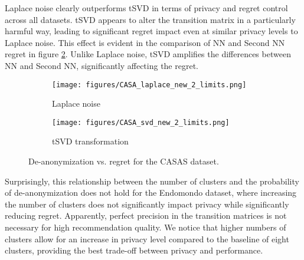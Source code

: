 \documentclass{article}
\begin{document}
Laplace noise clearly outperforms tSVD in terms of privacy and regret control across all datasets. tSVD appears to alter the transition matrix in a particularly harmful way, leading to significant regret impact even at similar privacy levels to Laplace noise. This effect is evident in the comparison of NN and Second NN regret in figure \ref{fig:CASAS_svd}. Unlike Laplace noise, tSVD amplifies the differences between NN and Second NN, significantly affecting the regret.

\begin{figure}
     \centering
     \begin{subfigure}[b]{0.45\textwidth}
         \centering
         \texttt{[image: figures/CASA\_laplace\_new\_2\_limits.png]}
         \caption{Laplace noise}
         \label{fig:CASAS_laplace}
     \end{subfigure}
     \hfill
     \begin{subfigure}[b]{0.45\textwidth}
         \centering
         \texttt{[image: figures/CASA\_svd\_new\_2\_limits.png]}
         \caption{tSVD transformation}
         \label{fig:CASAS_svd}
     \end{subfigure}
     \caption{De-anonymization vs. regret for the CASAS dataset.}
     \label{fig:CASAS_regret_privacy}
\end{figure}

Surprisingly, this relationship between the number of clusters and the probability of de-anonymization does not hold for the Endomondo dataset, where increasing the number of clusters does not significantly impact privacy while significantly reducing regret. Apparently, perfect precision in the transition matrices is not necessary for high recommendation quality. We notice that higher numbers of clusters allow for an increase in privacy level compared to the baseline of eight clusters, providing the best trade-off between privacy and performance. 

\end{document}
